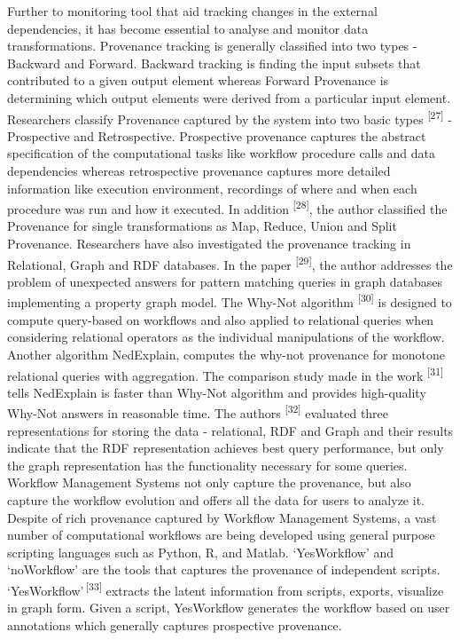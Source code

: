 \documentclass[6pt,,a4paper]{article}
\begin{document}
Further to monitoring tool that aid tracking changes in the external dependencies, it has become essential to analyse and monitor data transformations. Provenance tracking is generally classified into two types - Backward and Forward. Backward tracking is finding the input subsets that contributed to a given output element whereas Forward Provenance is determining which output elements were derived from a particular input element. 
Researchers classify Provenance captured by the system into two basic types \textsuperscript{[27]} - Prospective and Retrospective. Prospective provenance captures the abstract specification of the computational tasks like workflow procedure calls and data dependencies whereas retrospective provenance captures more detailed information like execution environment, recordings of where and when each procedure was run and how it executed. In addition \textsuperscript{[28]}, the author classified the Provenance for single transformations as Map, Reduce, Union and Split Provenance. 
Researchers have also investigated the provenance tracking in Relational, Graph and RDF databases. In the paper \textsuperscript{[29]}, the author addresses the problem of unexpected answers for pattern matching queries in graph databases implementing a property graph model. The Why-Not algorithm \textsuperscript{[30]} is designed to compute query-based on workflows and also applied to relational queries when considering relational operators as the individual manipulations of the workflow. Another algorithm NedExplain, computes the why-not provenance for monotone relational queries with aggregation. The comparison study made in the work \textsuperscript{[31]} tells NedExplain is faster than Why-Not algorithm and provides high-quality Why-Not answers in reasonable time. The authors \textsuperscript{[32]} evaluated three representations for storing the data - relational, RDF and Graph and their results indicate that the RDF representation achieves best query performance, but only the graph representation has the functionality necessary for some queries. 
Workflow Management Systems not only capture the provenance, but also capture the workflow evolution and offers all the data for users to analyze it. Despite of rich provenance captured by Workflow Management Systems, a vast number of computational workflows are being developed using general purpose scripting languages such as Python, R, and Matlab. ‘YesWorkflow’ and ‘noWorkflow’ are the tools that captures the provenance of independent scripts. ‘YesWorkflow’\,\textsuperscript{[33]} extracts the latent information from scripts, exports, visualize in graph form. Given a script, YesWorkflow generates the workflow based on user annotations which generally captures prospective provenance.
\end{document}
